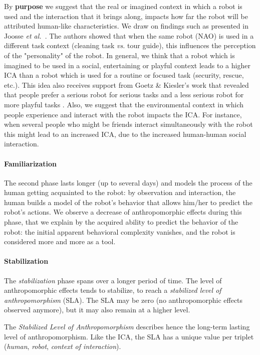 \documentclass{sig-alternate-2013}
\begin{document}
By \textbf{purpose} we suggest that the real or imagined context in which a
robot is used and the interaction that it brings along, impacts how far the
robot will be attributed human-like characteristics. We draw on findings such
as presented in Joosse \textit{et al.}~\cite{joosse_what_2013}. The authors showed
that when the same robot (NAO) is used in a different task context (cleaning
task \textit{vs.} tour guide), this influences the perception of the
"personality" of the robot. In general, we think that a robot which is imagined
to be used in a social, entertaining or playful context leads to a higher ICA
than a robot which is used for a routine or focused task (security, rescue, etc.). This
idea also receives support from Goetz \& Kiesler's work that revealed
that people prefer a serious robot for serious tasks and a less serious robot
for more playful tasks \cite{goetz_cooperation_2002, goetz_matching_2003}. Also, we suggest that the environmental
context in which people experience and interact with the robot impacts the ICA.
For instance, when several people who might be friends interact simultaneously with the robot
this might lead to an increased ICA, due to the increased human-human social interaction.

\paragraph*{Familiarization} The second phase lasts longer (up to several days)
and models the process of the human getting acquainted to the robot: by
observation and interaction, the human builds a model of the robot's behavior
that allows him/her to predict the robot's actions. We observe a decrease of
anthropomorphic effects during this phase, that we explain by the acquired
ability to predict the behavior of the robot: the initial apparent behavioral
complexity vanishes, and the robot is considered more and more as a tool.

\paragraph*{Stabilization} The \emph{stabilization} phase spans over a longer
period of time. The level of anthropomorphic effects tends to stabilize, to
reach a \emph{stabilized level of anthropomorphism} (SLA). The SLA may be zero
(no anthropomorphic effects observed anymore), but it may also remain at a
higher level.

The \emph{Stabilized Level of Anthropomorphism} describes hence the long-term 
lasting level of
anthropomorphism.  Like the ICA, the SLA has a unique value per triplet
(\emph{human}, \emph{robot}, \emph{context of interaction}).
\end{document}
